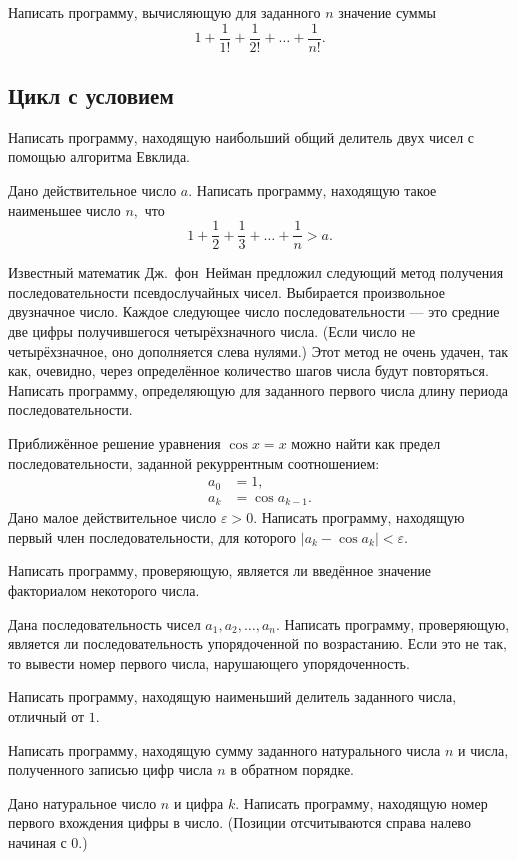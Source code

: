 \task Написать программу, вычисляющую для заданного $n$ значение суммы
\[
1+\frac1{1!} + \frac{1}{2!} + \ldots + \frac1{n!}.
\]

\subsection{Цикл с условием}

\task Написать программу, находящую наибольший общий делитель двух
чисел с помощью алгоритма Евклида.

\task Дано действительное число $a.$ Написать программу, находящую
такое наименьшее число $n,$ что
\[
1 + \frac12 + \frac13 + \ldots + \frac1n > a.
\]

\task Известный математик Дж.~фон~Нейман предложил следующий метод
получения последовательности псевдослучайных чисел. Выбирается
произвольное двузначное число. Каждое следующее число
последовательности — это средние две цифры получившегося
четырёхзначного числа. (Если число не четырёхзначное, оно дополняется
слева нулями.) Этот метод не очень удачен, так как, очевидно, через
определённое количество шагов числа будут повторяться. Написать
программу, определяющую для заданного первого числа длину периода
последовательности.

\task Приближённое решение уравнения $\cos x = x$ можно найти как
предел последовательности, заданной рекуррентным соотношением:
\begin{align*}
  a_0 &= 1,\\
  a_k &= \cos a_{k-1}.
\end{align*}
Дано малое действительное число $\varepsilon > 0$. Написать программу,
находящую первый член последовательности, для которого $|a_k - \cos
a_k| < \varepsilon.$

\task Написать программу, проверяющую, является ли введённое значение
факториалом некоторого числа.

\task Дана последовательность чисел $a_1, a_2, \ldots, a_n.$ Написать
программу, проверяющую, является ли последовательность упорядоченной
по возрастанию. Если это не так, то вывести номер первого числа,
нарушающего упорядоченность.

\task Написать программу, находящую наименьший делитель заданного
числа, отличный от $1.$

\task Написать программу, находящую сумму заданного натурального числа
$n$ и числа, полученного записью цифр числа $n$ в обратном порядке.

\task Дано натуральное число $n$ и цифра $k.$ Написать программу,
находящую номер первого вхождения цифры в число. (Позиции
отсчитываются справа налево начиная с 0.)

